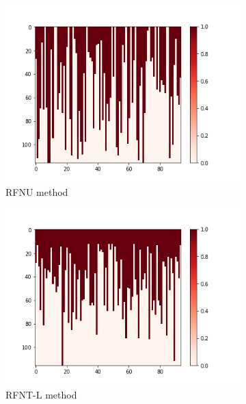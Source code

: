 \documentclass[10pt, conference, compsocconf]{IEEEtran}
\begin{document}
\begin{figure}[h!]
\begin{subfigure}[b]{0.4\linewidth}
  		\includegraphics[width=\columnwidth]{figures/5vs7_diagonal_04_training}
  		\caption{RFNU  method }
  		\label{fig:Diagonal-Sample-Training-set}
	\end{subfigure}
	\begin{subfigure}[b]{0.4\linewidth}
  		\includegraphics[width=\columnwidth]{figures/5vs7_random-triangular-largest_04_training}
  		\caption{RFNT-L method}
  		\label{fig:triangular-L-Sample-Training-set}
	\end{subfigure}
	\begin{subfigure}[b]{0.4\linewidth}

\end{subfigure}
\end{figure}
\end{document}
